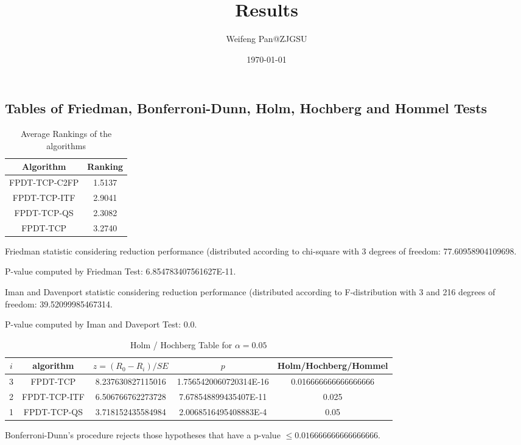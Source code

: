 \documentclass[a4paper,10pt]{article}
\title{Results}
\author{Weifeng Pan@ZJGSU}
\date{\today}
\begin{document}
\begin{landscape}
\oddsidemargin 0in \topmargin 0in\maketitle
\section{Tables of Friedman, Bonferroni-Dunn, Holm, Hochberg and Hommel Tests}
\begin{table}[!htp]
\centering
\caption{Average Rankings of the algorithms
}\begin{tabular}{c|c}
Algorithm&Ranking\\
\hline
FPDT-TCP-C2FP&1.5137\\
FPDT-TCP-ITF&2.9041\\
FPDT-TCP-QS&2.3082\\
FPDT-TCP&3.2740\\
\end{tabular}
\end{table}


Friedman statistic considering reduction performance (distributed according to chi-square with 3 degrees of freedom: 77.60958904109698.


P-value computed by Friedman Test: 6.854783407561627E-11.\newline

Iman and Davenport statistic considering reduction performance (distributed according to F-distribution with 3 and 216 degrees of freedom: 39.52099985467314.


P-value computed by Iman and Daveport Test: 0.0.\newline

\begin{table}[!htp]
\centering\tiny
\caption{Holm / Hochberg Table for $\alpha=0.05$}
\begin{tabular}{ccccc}
$i$&algorithm&$z=(R_0 - R_i)/SE$&$p$&Holm/Hochberg/Hommel\\
\hline
3&FPDT-TCP&8.237630827115016&1.7565420060720314E-16&0.016666666666666666\\
2&FPDT-TCP-ITF&6.506766762273728&7.678548899435407E-11&0.025\\
1&FPDT-TCP-QS&3.718152435584984&2.0068516495408883E-4&0.05\\
\hline
\end{tabular}
\end{table}
Bonferroni-Dunn's procedure rejects those hypotheses that have a p-value $\le0.016666666666666666$.



\end{landscape}
\end{document}
